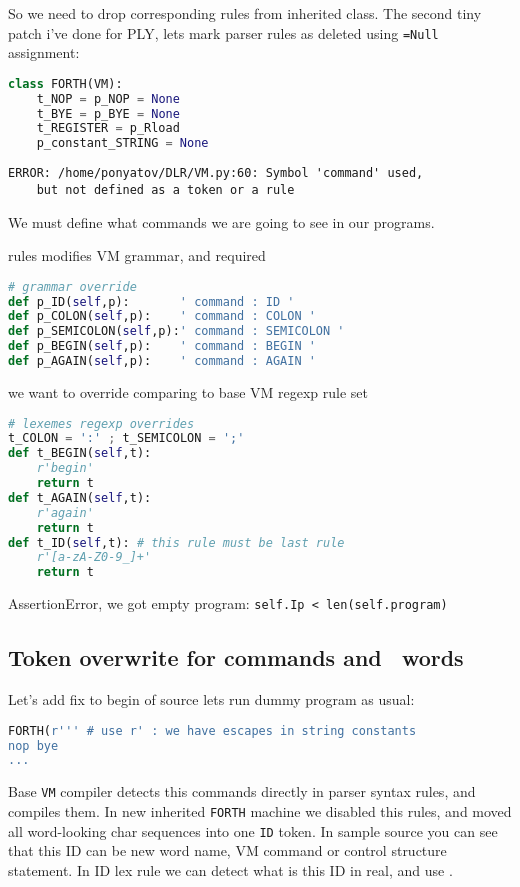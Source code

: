 So we need to drop corresponding rules
from inherited class.
The second tiny patch i've done for PLY, lets mark parser rules as deleted using
\verb|=Null| assignment:
\begin{lstlisting}[language=Python]
class FORTH(VM):
	t_NOP = p_NOP = None
 	t_BYE = p_BYE = None
 	t_REGISTER = p_Rload
 	p_constant_STRING = None
\end{lstlisting}
\begin{lstlisting}
ERROR: /home/ponyatov/DLR/VM.py:60: Symbol 'command' used,
	but not defined as a token or a rule
\end{lstlisting}
We must define what commands we are going to see in our programs.
\begin{description}[nosep]
\item[grammar] rules modifies VM grammar, and required
\begin{lstlisting}[language=Python]
# grammar override
def p_ID(self,p):		' command : ID '
def p_COLON(self,p):	' command : COLON '
def p_SEMICOLON(self,p):' command : SEMICOLON '
def p_BEGIN(self,p):	' command : BEGIN '
def p_AGAIN(self,p):	' command : AGAIN '
\end{lstlisting}
\item[lexemes] we want to override comparing to base VM regexp rule set
\begin{lstlisting}[language=Python]
# lexemes regexp overrides
t_COLON = ':' ; t_SEMICOLON = ';'
def t_BEGIN(self,t):
	r'begin'
	return t 
def t_AGAIN(self,t):
	r'again'
	return t
def t_ID(self,t): # this rule must be last rule
	r'[a-zA-Z0-9_]+'
	return t 
\end{lstlisting}
\end{description}
AssertionError, we got empty program:
\verb|self.Ip < len(self.program)|

\subsection{Token overwrite for commands and \F\ words}

Let's add fix to begin of source lets run dummy program as usual:
\begin{lstlisting}[language=Python]
FORTH(r''' # use r' : we have escapes in string constants
nop bye
...
\end{lstlisting}
Base \verb|VM| compiler detects this commands directly in parser syntax rules,
and compiles them. In new inherited \verb|FORTH| machine we disabled this rules,
and moved all word-looking char sequences into one \verb|ID| token. In sample
source you can see that this ID can be new word name, VM command or control
structure statement. In ID lex rule we can detect what is this ID in
real, and use .

